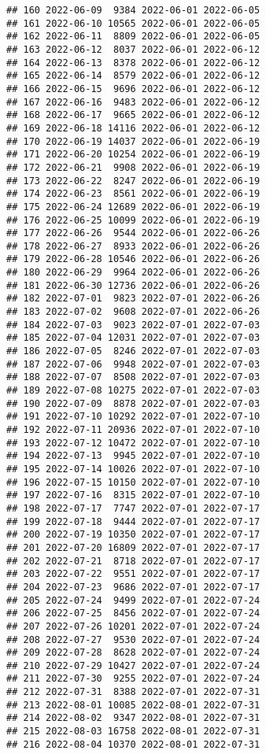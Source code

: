 \documentclass[
]{article}
\begin{document}
\begin{verbatim}
## 160 2022-06-09  9384 2022-06-01 2022-06-05
## 161 2022-06-10 10565 2022-06-01 2022-06-05
## 162 2022-06-11  8809 2022-06-01 2022-06-05
## 163 2022-06-12  8037 2022-06-01 2022-06-12
## 164 2022-06-13  8378 2022-06-01 2022-06-12
## 165 2022-06-14  8579 2022-06-01 2022-06-12
## 166 2022-06-15  9696 2022-06-01 2022-06-12
## 167 2022-06-16  9483 2022-06-01 2022-06-12
## 168 2022-06-17  9665 2022-06-01 2022-06-12
## 169 2022-06-18 14116 2022-06-01 2022-06-12
## 170 2022-06-19 14037 2022-06-01 2022-06-19
## 171 2022-06-20 10254 2022-06-01 2022-06-19
## 172 2022-06-21  9908 2022-06-01 2022-06-19
## 173 2022-06-22  8247 2022-06-01 2022-06-19
## 174 2022-06-23  8561 2022-06-01 2022-06-19
## 175 2022-06-24 12689 2022-06-01 2022-06-19
## 176 2022-06-25 10099 2022-06-01 2022-06-19
## 177 2022-06-26  9544 2022-06-01 2022-06-26
## 178 2022-06-27  8933 2022-06-01 2022-06-26
## 179 2022-06-28 10546 2022-06-01 2022-06-26
## 180 2022-06-29  9964 2022-06-01 2022-06-26
## 181 2022-06-30 12736 2022-06-01 2022-06-26
## 182 2022-07-01  9823 2022-07-01 2022-06-26
## 183 2022-07-02  9608 2022-07-01 2022-06-26
## 184 2022-07-03  9023 2022-07-01 2022-07-03
## 185 2022-07-04 12031 2022-07-01 2022-07-03
## 186 2022-07-05  8246 2022-07-01 2022-07-03
## 187 2022-07-06  9948 2022-07-01 2022-07-03
## 188 2022-07-07  8508 2022-07-01 2022-07-03
## 189 2022-07-08 10275 2022-07-01 2022-07-03
## 190 2022-07-09  8878 2022-07-01 2022-07-03
## 191 2022-07-10 10292 2022-07-01 2022-07-10
## 192 2022-07-11 20936 2022-07-01 2022-07-10
## 193 2022-07-12 10472 2022-07-01 2022-07-10
## 194 2022-07-13  9945 2022-07-01 2022-07-10
## 195 2022-07-14 10026 2022-07-01 2022-07-10
## 196 2022-07-15 10150 2022-07-01 2022-07-10
## 197 2022-07-16  8315 2022-07-01 2022-07-10
## 198 2022-07-17  7747 2022-07-01 2022-07-17
## 199 2022-07-18  9444 2022-07-01 2022-07-17
## 200 2022-07-19 10350 2022-07-01 2022-07-17
## 201 2022-07-20 16809 2022-07-01 2022-07-17
## 202 2022-07-21  8718 2022-07-01 2022-07-17
## 203 2022-07-22  9551 2022-07-01 2022-07-17
## 204 2022-07-23  9686 2022-07-01 2022-07-17
## 205 2022-07-24  9499 2022-07-01 2022-07-24
## 206 2022-07-25  8456 2022-07-01 2022-07-24
## 207 2022-07-26 10201 2022-07-01 2022-07-24
## 208 2022-07-27  9530 2022-07-01 2022-07-24
## 209 2022-07-28  8628 2022-07-01 2022-07-24
## 210 2022-07-29 10427 2022-07-01 2022-07-24
## 211 2022-07-30  9255 2022-07-01 2022-07-24
## 212 2022-07-31  8388 2022-07-01 2022-07-31
## 213 2022-08-01 10085 2022-08-01 2022-07-31
## 214 2022-08-02  9347 2022-08-01 2022-07-31
## 215 2022-08-03 16758 2022-08-01 2022-07-31
## 216 2022-08-04 10370 2022-08-01 2022-07-31

\end{verbatim}
\end{document}
